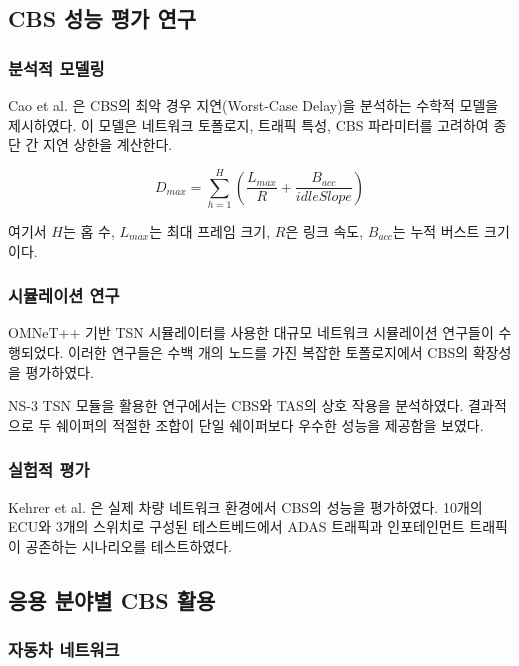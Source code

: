 \documentclass[twocolumn,10pt]{article}
\begin{document}
\subsection{CBS 성능 평가 연구}

\subsubsection{분석적 모델링}

Cao et al. \cite{cao2021analytical}은 CBS의 최악 경우 지연(Worst-Case Delay)을 분석하는 수학적 모델을 제시하였다. 이 모델은 네트워크 토폴로지, 트래픽 특성, CBS 파라미터를 고려하여 종단 간 지연 상한을 계산한다.

\begin{equation}
D_{max} = \sum_{h=1}^{H} \left( \frac{L_{max}}{R} + \frac{B_{acc}}{idleSlope} \right)
\end{equation}

여기서 $H$는 홉 수, $L_{max}$는 최대 프레임 크기, $R$은 링크 속도, $B_{acc}$는 누적 버스트 크기이다.

\subsubsection{시뮬레이션 연구}

OMNeT++ 기반 TSN 시뮬레이터\cite{nafar2021omnet}를 사용한 대규모 네트워크 시뮬레이션 연구들이 수행되었다. 이러한 연구들은 수백 개의 노드를 가진 복잡한 토폴로지에서 CBS의 확장성을 평가하였다.

NS-3 TSN 모듈\cite{bhattacharjee2023ns3}을 활용한 연구에서는 CBS와 TAS의 상호 작용을 분석하였다. 결과적으로 두 쉐이퍼의 적절한 조합이 단일 쉐이퍼보다 우수한 성능을 제공함을 보였다.

\subsubsection{실험적 평가}

Kehrer et al. \cite{kehrer2022experimental}은 실제 차량 네트워크 환경에서 CBS의 성능을 평가하였다. 10개의 ECU와 3개의 스위치로 구성된 테스트베드에서 ADAS 트래픽과 인포테인먼트 트래픽이 공존하는 시나리오를 테스트하였다.

\subsection{응용 분야별 CBS 활용}

\subsubsection{자동차 네트워크}
\end{document}
